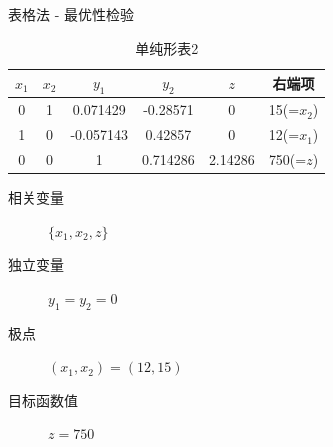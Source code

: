\documentclass[UTF8]{ctexbeamer}
\begin{document}
\begin{frame}{表格法 - 最优性检验}

  \begin{table}
    \centering
    \begin{tabular}{|ccccc|c|}
      \hline
      $x_1$ & $x_2$ & $y_1$ & $y_2$ & $z$ & 右端项 \\
      \hline
      0 & 1 & 0.071429 & -0.28571 & 0 & 15(=$x_2$)\\
      1 & 0 & -0.057143 & 0.42857 & 0 & 12(=$x_1$)\\
      \hline
      0 & 0 & 1 & 0.714286 & 2.14286 & {\color{green}750(=$z$)}\\
      \hline
    \end{tabular}
    \caption{单纯形表2}
  \end{table}

  \begin{description}
  \item[相关变量] $\{x_1, x_2, z\}$
  \item[独立变量] $y_1=y_2=0$
  \item[极点] $(x_1, x_2) = (12, 15)$
  \item[目标函数值] $z = 750$
  \end{description}

\end{frame}
\end{document}

